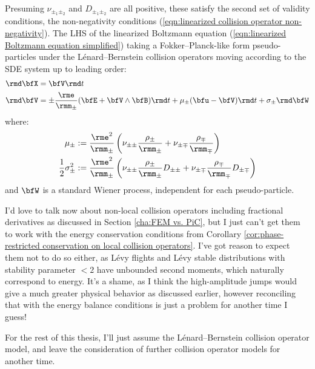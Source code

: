     Presuming $\nu_{\pm_{1}\pm_{2}}$ and $D_{\pm_{1}\pm_{2}}$ are all positive, these satisfy the second set of validity conditions, the non-negativity conditions (\ref{eqn:linearized collision operator non-negativity}). The LHS of the linearized Boltzmann equation (\ref{eqn:linearized Boltzmann equation simplified}) taking a Fokker--Planck-like form \cite{Fokker_1914, Planck_1917} pseudo-particles under the Lénard--Bernstein collision operators moving according to the SDE system up to leading order:
    \begin{align}
        \rmd\bfX  &=  \bfV\rmd t  \\
        \rmd\bfV  &=  \pm\frac{\rme}{\rmm_{\pm}}(\bfE + \bfV\wedge\bfB)\rmd t + \mu_{\pm}(\bfu - \bfV)\rmd t + \sigma_{\pm}\rmd\bfW
    \end{align}
    where:
    \begin{align}
        \mu_{\pm}     &:=  \frac{\rme^{2}}{\rmm_{\pm}}\left(\nu_{\pm\pm}\frac{\rho_{\pm}}{\rmm_{\pm}} + \nu_{\pm\mp}\frac{\rho_{\mp}}{\rmm_{\mp}}\right)  \\
        \frac{1}{2}\sigma_{\pm}^{2}  &:=  \frac{\rme^{2}}{\rmm_{\pm}}\left(\nu_{\pm\pm}\frac{\rho_{\pm}}{\rmm_{\pm}}D_{\pm\pm} + \nu_{\pm\mp}\frac{\rho_{\mp}}{\rmm_{\mp}}D_{\pm\mp}\right)
    \end{align}
    and $\bfW$ is a standard Wiener process, independent for each pseudo-particle.

    \begin{remark}
        I'd love to talk now about non-local collision operators including fractional derivatives as discussed in Section \ref{cha:FEM vs. PiC}, but I just can't get them to work with the energy conservation conditions from Corollary \ref{cor:phase-restricted conservation on local collision operators}. I've got reason to expect them not to do so either, as Lévy flights and Lévy stable distributions with stability parameter $< 2$ have unbounded second moments, which naturally correspond to energy. It's a shame, as I think the high-amplitude jumps would give a much greater physical behavior as discussed earlier, however reconciling that with the energy balance conditions is just a problem for another time I guess!

        For the rest of this thesis, I'll just assume the Lénard--Bernstein collision operator model, and leave the consideration of further collision operator models for another time.
    \end{remark}
    
